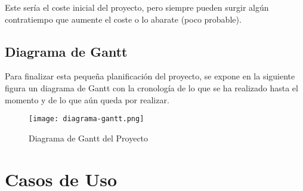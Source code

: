 Este sería el coste inicial del proyecto, pero siempre pueden surgir algún contratiempo que aumente el coste o lo abarate (poco probable).

\subsection{Diagrama de Gantt}
Para finalizar esta pequeña planificación del proyecto, se expone en la siguiente figura un diagrama de Gantt con la cronología de lo que se ha realizado hasta el momento y de lo que aún queda por realizar.

\begin{figure}[ht]
	\centering
	\texttt{[image: diagrama-gantt.png]}
	\caption{Diagrama de Gantt del Proyecto}
\end{figure}

\section{Casos de Uso}





\newpage

\appendix


